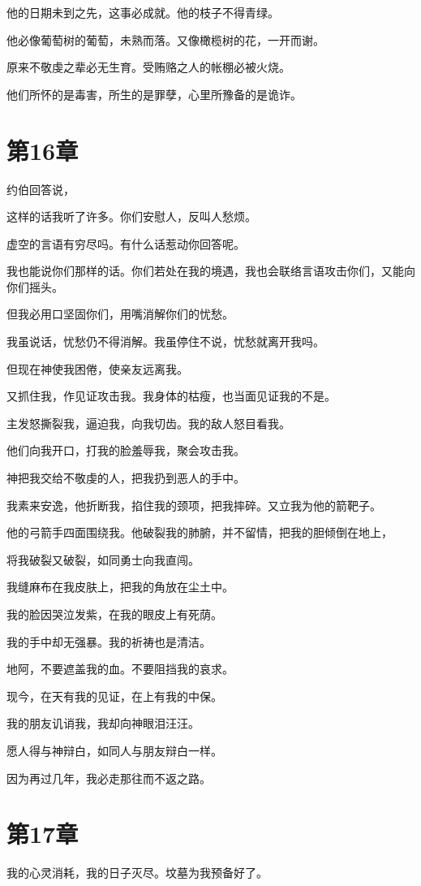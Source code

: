 \documentclass[12pt,oneside]{book}
\begin{document}
他的日期未到之先，这事必成就。他的枝子不得青绿。

他必像葡萄树的葡萄，未熟而落。又像橄榄树的花，一开而谢。

原来不敬虔之辈必无生育。受贿赂之人的帐棚必被火烧。

他们所怀的是毒害，所生的是罪孽，心里所豫备的是诡诈。



\chapter{第16章}
约伯回答说，

这样的话我听了许多。你们安慰人，反叫人愁烦。

虚空的言语有穷尽吗。有什么话惹动你回答呢。

我也能说你们那样的话。你们若处在我的境遇，我也会联络言语攻击你们，又能向你们摇头。

但我必用口坚固你们，用嘴消解你们的忧愁。

我虽说话，忧愁仍不得消解。我虽停住不说，忧愁就离开我吗。

但现在神使我困倦，使亲友远离我。

又抓住我，作见证攻击我。我身体的枯瘦，也当面见证我的不是。

主发怒撕裂我，逼迫我，向我切齿。我的敌人怒目看我。

他们向我开口，打我的脸羞辱我，聚会攻击我。

神把我交给不敬虔的人，把我扔到恶人的手中。

我素来安逸，他折断我，掐住我的颈项，把我摔碎。又立我为他的箭靶子。

他的弓箭手四面围绕我。他破裂我的肺腑，并不留情，把我的胆倾倒在地上，

将我破裂又破裂，如同勇士向我直闯。

我缝麻布在我皮肤上，把我的角放在尘土中。

我的脸因哭泣发紫，在我的眼皮上有死荫。

我的手中却无强暴。我的祈祷也是清洁。

地阿，不要遮盖我的血。不要阻挡我的哀求。

现今，在天有我的见证，在上有我的中保。

我的朋友讥诮我，我却向神眼泪汪汪。

愿人得与神辩白，如同人与朋友辩白一样。

因为再过几年，我必走那往而不返之路。


\chapter{第17章}
我的心灵消耗，我的日子灭尽。坟墓为我预备好了。
\end{document}
